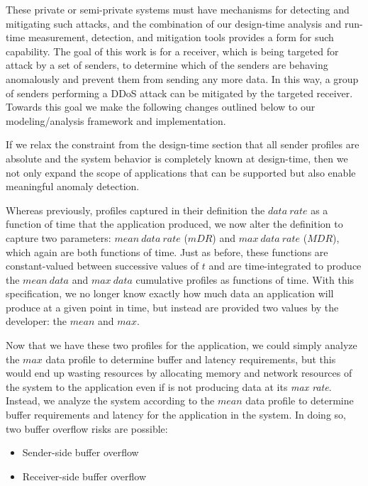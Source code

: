 These private or semi-private systems must have mechanisms for
detecting and mitigating such attacks, and the combination of our
design-time analysis and run-time measurement, detection, and
mitigation tools provides a form for such capability.  The goal of
this work is for a receiver, which is being targeted for attack by a
set of senders, to determine which of the senders are behaving
anomalously and prevent them from sending any more data.  In this way,
a group of senders performing a DDoS attack can be mitigated by the
targeted receiver.  Towards this goal we make the following changes
outlined below to our modeling/analysis framework and implementation.

If we relax the constraint from the design-time section that all
sender profiles are absolute and the system behavior is completely
known at design-time, then we not only expand the scope of
applications that can be supported but also enable meaningful anomaly
detection.

Whereas previously, profiles captured in their definition the
$data\ rate$ as a function of time that the application
produced, we now alter the definition to capture two parameters:
$mean\ data\ rate$ ($mDR$) and $max\ data\ rate$
($MDR$), which again are both functions of time.  Just as
before, these functions are constant-valued between successive values
of $t$ and are time-integrated to produce the $mean\ data$
and $max\ data$ cumulative profiles as functions of time.  With
this specification, we no longer know exactly how much data an
application will produce at a given point in time, but instead are
provided two values by the developer: the $mean$ and
$max$.

Now that we have these two profiles for the application, we could
simply analyze the $max$ data profile to determine buffer and
latency requirements, but this would end up wasting resources by
allocating memory and network resources of the system to the
application even if is not producing data at its \emph{max rate}.  Instead,
we analyze the system according to the $mean$ data profile to
determine buffer requirements and latency for the application in the
system.  In doing so, two buffer overflow risks are possible:

\begin{itemize}
\item Sender-side buffer overflow
\item Receiver-side buffer overflow
\end{itemize}

